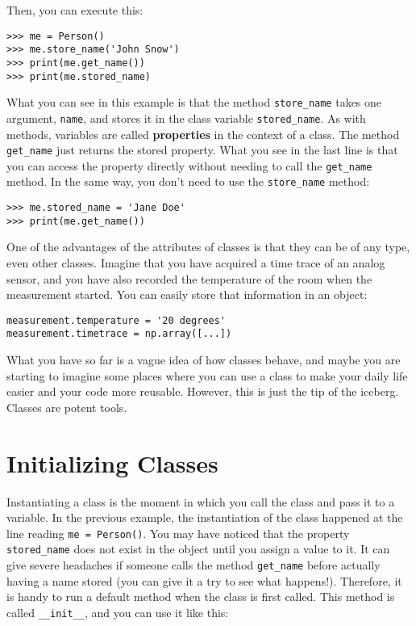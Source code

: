 Then, you can execute this:

\begin{verbatim}
>>> me = Person()
>>> me.store_name('John Snow')
>>> print(me.get_name())
>>> print(me.stored_name)
\end{verbatim}

What you can see in this example is that the method \texttt{store_name} takes one argument, \texttt{name}, and stores it in the class variable \texttt{stored_name}. As with methods, variables are called \textbf{properties} in the context of a class. The method \texttt{get_name} just returns the stored property. What you see in the last line is that you can access the property directly without needing to call the \texttt{get_name} method. In the same way, you don't need to use the \texttt{store_name} method:

\begin{verbatim}
>>> me.stored_name = 'Jane Doe'
>>> print(me.get_name())
\end{verbatim}

One of the advantages of the attributes of classes is that they can be of any type, even other classes. Imagine that you have acquired a time trace of an analog sensor, and you have also recorded the temperature of the room when the measurement started. You can easily store that information in an object:

\begin{verbatim}
measurement.temperature = '20 degrees'
measurement.timetrace = np.array([...])
\end{verbatim}

What you have so far is a vague idea of how classes behave, and maybe you are starting to imagine some places where you can use a class to make your daily life easier and your code more reusable. However, this is just the tip of the iceberg. Classes are potent tools.

\section{Initializing Classes}\label{sec:initializing-classes}
Instantiating a class is the moment in which you call the class and pass it to a variable. In the previous example, the instantiation of the class happened at the line reading \texttt{me = Person()}. You may have noticed that the property \texttt{stored_name} does not exist in the object until you assign a value to it. It can give severe headaches if someone calls the method \texttt{get_name} before actually having a name stored (you can give it a try to see what happens!). Therefore, it is handy to run a default method when the class is first called. This method is called \texttt{__init__}, and you can use it like this:

